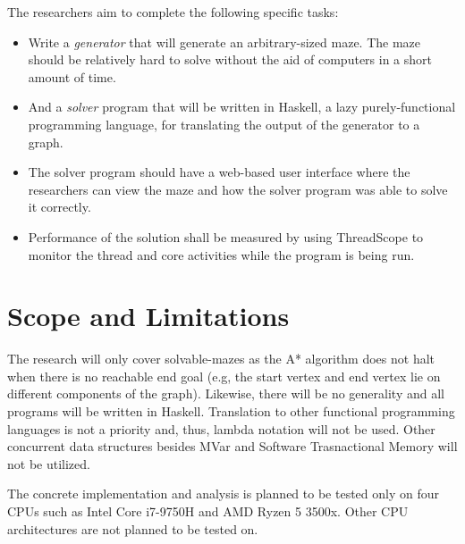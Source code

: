 The researchers aim to complete the following specific tasks:
\begin{itemize}
    \item Write a \emph{generator} that will generate an arbitrary-sized maze. The maze should be relatively 
        hard to solve without the aid of computers in a short amount of time.\cite{Buck2015}
    \item And a \emph{solver} program that will be written in Haskell, a lazy purely-functional programming language,
        for translating the output of the generator to a graph.\cite{HaskellSite}
    \item The solver program should have a web-based user interface where the researchers can view the maze and how 
        the solver program was able to solve it correctly.
    \item Performance of the solution shall be measured by using ThreadScope to monitor the thread and core activities 
        while the program is being run.\cite{ThreadScope}
\end{itemize}
\section{Scope and Limitations}

The research will only cover solvable-mazes as the A* algorithm does not halt when there is no reachable end goal (e.g,
the start vertex and end vertex lie on different components of the graph).\cite{HartNilssonRaphael1968} Likewise, there will be no generality
and all programs will be written in Haskell. Translation to other functional programming languages is not a priority and, thus,
lambda notation will not be used. Other concurrent data structures besides MVar and Software Trasnactional Memory will not be utilized.

The concrete implementation and analysis is planned to be tested only on four CPUs such as Intel Core i7-9750H and AMD Ryzen 5 3500x.
Other CPU architectures are not planned to be tested on.